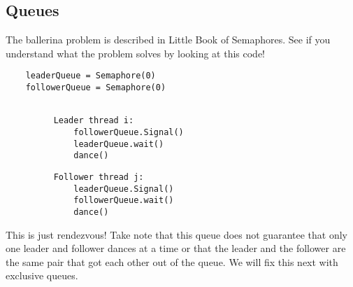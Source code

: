 \subsection{Queues}
The ballerina problem is described in Little Book of Semaphores. See if you understand what the problem solves by looking at this code!
\begin{verbatim}
    leaderQueue = Semaphore(0)
    followerQueue = Semaphore(0)
    
\end{verbatim}
\begin{figure}[H]
    \begin{minipage}{0.5\textwidth}
    \centering
    \begin{verbatim}
    Leader thread i:
        followerQueue.Signal()
        leaderQueue.wait()
        dance()
    \end{verbatim}
    \end{minipage}
     \begin{minipage}{0.5\textwidth}
    \centering
    \begin{verbatim}
    Follower thread j:
        leaderQueue.Signal()
        followerQueue.wait()
        dance()
    \end{verbatim}
    \end{minipage}
\end{figure}

This is just rendezvous! Take note that this queue does not guarantee that only one leader and follower dances at a time or that the leader and the follower are the same pair that got each other out of the queue. We will fix this next with exclusive queues.

\newpage
